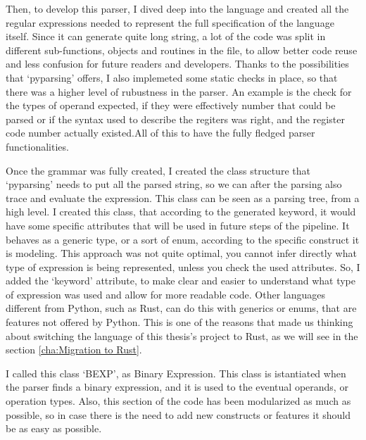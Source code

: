 Then, to develop this parser, I dived deep into the language and created all the
regular expressions needed to represent the full specification of the language
itself. Since it can generate quite long string, a lot of the code was split in
different sub-functions, objects and routines in the file, to allow better code
reuse and less confusion for future readers and developers. Thanks to the possibilities
that `pyparsing' offers, I also implemeted some static checks in place, so that there
was a higher level of rubustness in the parser. An example is the check for the
types of operand expected, if they were effectively number that could be parsed or
if the syntax used to describe the regiters was right, and the register code
number actually existed.All of this to have the fully fledged parser
functionalities.

Once the grammar was fully created, I created the class structure that `pyparsing'
needs to put all the parsed string, so we can after the parsing also trace and
evaluate the expression. This class can be seen as a parsing tree, from a high
level. I created this class, that according to the generated keyword, it would have
some specific attributes that will be used in future steps of the pipeline. It
behaves as a generic type, or a sort of enum, according to the specific
construct it is modeling. This approach was not quite optimal, you cannot infer
directly what type of expression is being represented, unless you check the used
attributes. So, I added the `keyword' attribute, to make clear and easier to
understand what type of expression was used and allow for more readable code. Other
languages different from Python, such as Rust, can do this with generics or enums,
that are features not offered by Python. This is one of the reasons that made us
thinking about switching the language of this thesis's project to Rust, as we
will see in the section \ref{cha:Migration to Rust}.

I called this class `BEXP', as Binary Expression. This class is istantiated when
the parser finds a binary expression, and it is used to the eventual operands,
or operation types. Also, this section of the code has been modularized as much
as possible, so in case there is the need to add new constructs or features it should
be as easy as possible.

